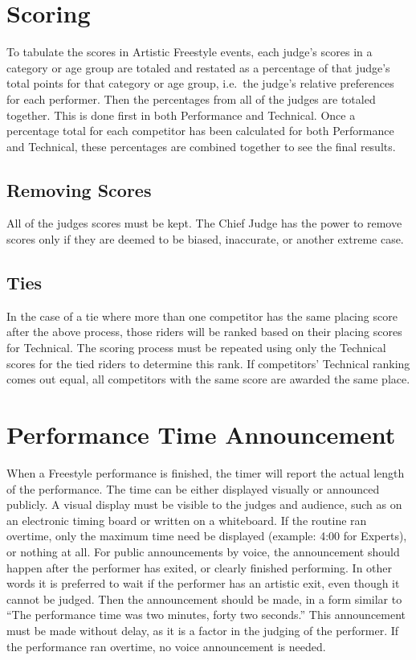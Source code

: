 \section{Scoring}
To tabulate the scores in Artistic Freestyle events, each judge's scores in a category or age group are totaled and restated as a percentage of that judge's total points for that category or age group, i.e.\ the judge's relative preferences for each performer.
Then the percentages from all of the judges are totaled together.
This is done first in both Performance and Technical.
Once a percentage total for each competitor has been calculated for both Performance and Technical, these percentages are combined together to see the final results.

\subsection{Removing Scores}
All of the judges scores must be kept.
The Chief Judge has the power to remove scores only if they are deemed to be biased, inaccurate, or another extreme case.

\subsection{Ties}
In the case of a tie where more than one competitor has the same placing score after the above process, those riders will be ranked based on their placing scores for Technical.
The scoring process must be repeated using only the Technical scores for the tied riders to determine this rank.
If competitors' Technical ranking comes out equal, all competitors with the same score are awarded the same place.

\section{Performance Time Announcement} %
When a Freestyle performance is finished, the timer will report the actual length of the performance.
The time can be either displayed visually or announced publicly.
A visual display must be visible to the judges and audience, such as on an electronic timing board or written on a whiteboard.
If the routine ran overtime, only the maximum time need be displayed (example: 4:00 for Experts), or nothing at all.
For public announcements by voice, the announcement should happen after the performer has exited, or clearly finished performing.
In other words it is preferred to wait if the performer has an artistic exit, even though it cannot be judged.
Then the announcement should be made, in a form similar to ``The performance time was two minutes, forty two seconds.'' This announcement must be made without delay, as it is a factor in the judging of the performer.
If the performance ran overtime, no voice announcement is needed.

